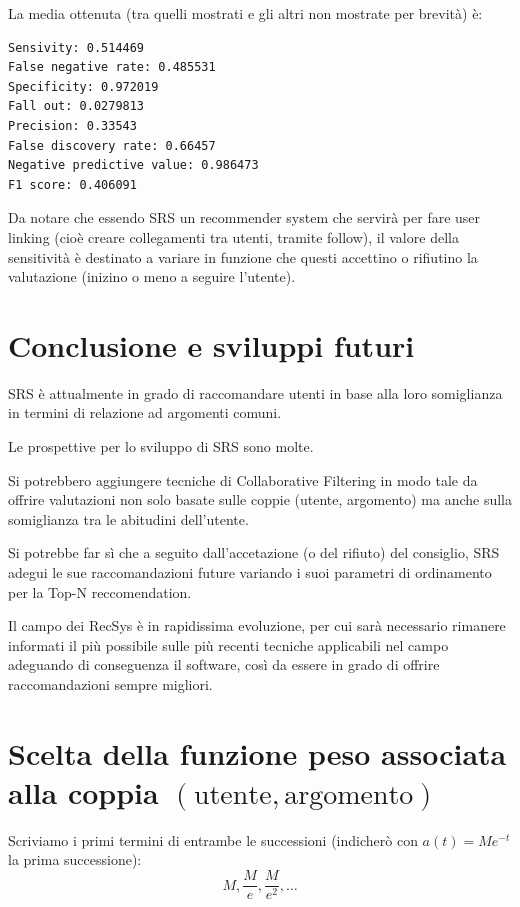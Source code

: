 {La media ottenuta (tra quelli mostrati e gli altri non mostrate per brevità) è:

\begin{lstlisting}[language=xml, caption=Alcuni risultati dai test sul dataset]
Sensivity: 0.514469
False negative rate: 0.485531
Specificity: 0.972019
Fall out: 0.0279813
Precision: 0.33543
False discovery rate: 0.66457
Negative predictive value: 0.986473
F1 score: 0.406091
\end{lstlisting}

Da notare che essendo SRS un recommender system che servirà per fare user linking (cioè creare collegamenti tra utenti, tramite follow), il valore della sensitività è destinato a variare in funzione che questi accettino o rifiutino la valutazione (inizino o meno a seguire l'utente).

\clearpage
\section{Conclusione e sviluppi futuri}
SRS è attualmente in grado di raccomandare utenti in base alla loro somiglianza in termini di relazione ad argomenti comuni.

Le prospettive per lo sviluppo di SRS sono molte.

Si potrebbero aggiungere tecniche di Collaborative Filtering in modo tale da offrire valutazioni non solo basate sulle coppie (utente, argomento) ma anche sulla somiglianza tra le abitudini dell'utente.

Si potrebbe far sì che a seguito dall'accetazione (o del rifiuto) del consiglio, SRS adegui le sue raccomandazioni future variando i suoi parametri di ordinamento per la Top-N reccomendation.

Il campo dei RecSys è in rapidissima evoluzione, per cui sarà necessario rimanere informati il più possibile sulle più recenti tecniche applicabili nel campo adeguando di conseguenza il software, così da essere in grado di offrire raccomandazioni sempre migliori.
\clearpage
\appendix
\section{Scelta della funzione peso associata alla coppia $(\text{utente}, \text{argomento})$}

Scriviamo i primi termini di entrambe le successioni (indicherò con $a(t) = Me^{-t}$ la prima successione):                       
$$ M, \frac{M}{e}, \frac{M}{e^2},\ldots $$

}

